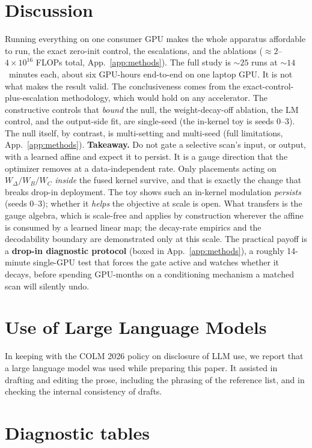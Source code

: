 \documentclass{article}
\begin{document}
\section{Discussion}\label{sec:discussion}

Running everything on one consumer GPU makes the whole apparatus affordable to
run, the exact zero-init control, the escalations, and the ablations
(${\approx}2$--$4\times10^{16}$ FLOPs total, App.~\ref{app:methods}). The full
study is ${\sim}25$ runs at ${\sim}14$~minutes each, about six GPU-hours
end-to-end on one laptop GPU. It is not what makes the result valid. The conclusiveness comes from the
exact-control-plus-escalation methodology, which would hold on any accelerator.
The constructive controls that \emph{bound}
the null, the weight-decay-off ablation, the LM control, and the output-side fit,
are single-seed (the in-kernel toy is seeds 0--3). The null itself, by contrast,
is multi-setting and multi-seed (full limitations, App.~\ref{app:methods}).
\textbf{Takeaway.} Do not gate a selective scan's input, or output, with a learned
affine and expect it to persist. It is a gauge direction that the optimizer
removes at a data-independent rate. Only placements acting on $W_\Delta/W_B/W_C$
\emph{inside} the fused kernel survive, and that is exactly the change that breaks
drop-in deployment. The toy shows such an in-kernel modulation \emph{persists}
(seeds 0--3); whether it \emph{helps} the objective at scale is open. What
transfers is the gauge algebra, which is scale-free and applies by construction
wherever the affine is consumed by a learned linear map; the decay-rate empirics
and the decodability boundary are demonstrated only at this scale. The practical
payoff is a \textbf{drop-in diagnostic protocol} (boxed in App.~\ref{app:methods}),
a roughly 14-minute single-GPU test that forces the gate active and watches
whether it decays, before spending GPU-months on a conditioning mechanism a
matched scan will silently undo.

\section*{Use of Large Language Models}
In keeping with the COLM 2026 policy on disclosure of LLM use, we report that a large language model was used while preparing this paper. It assisted in drafting and editing the prose, including the phrasing of the reference list, and in checking the internal consistency of drafts.

\appendix
\section{Diagnostic tables}\label{app:tables}
\end{document}
